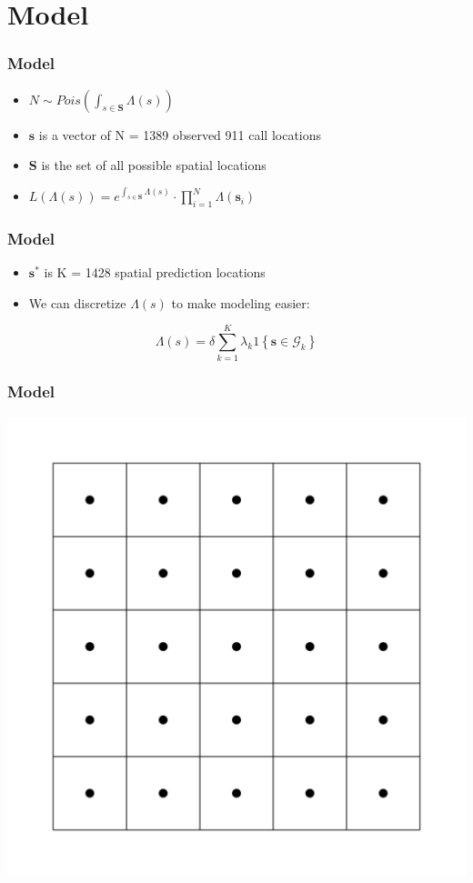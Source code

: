 \documentclass[10pt, compress]{beamer}
\begin{document}
  \section{Model}
  \begin{frame}
    \frametitle{Model}
      \begin{itemize}
        \item $N \sim Pois(\int_{s\in \mathbf{S}} \Lambda(s))$
        \item $\mathbf{s}$ is a vector of N = 1389 observed 911 call locations
        \item $\mathbf{S}$ is the set of all possible spatial locations
        \item $L(\Lambda(s)) = e^{\int_{s\in\mathbf{S}}\Lambda(s)}\cdot \prod_{i=1}^{N}\Lambda(\mathbf{s}_i)$
      \end{itemize}
  \end{frame}
  \begin{frame}
    \frametitle{Model}
    \begin{itemize}
      \item $\mathbf{s}^{*}$ is K = 1428 spatial prediction locations
      \item We can discretize $\Lambda(s)$ to make modeling easier:
    \end{itemize}
        $$ \Lambda(s) = \delta \sum_{k=1}^K \lambda_k 1 \left\{ \mathbf{s} \in \mathcal{G}_k \right\} $$
  \end{frame}
  \begin{frame}
    \frametitle{Model}
    \centering
    \includegraphics[height=0.8\textheight]{blank_grid.pdf}
  \end{frame}
\end{document}

